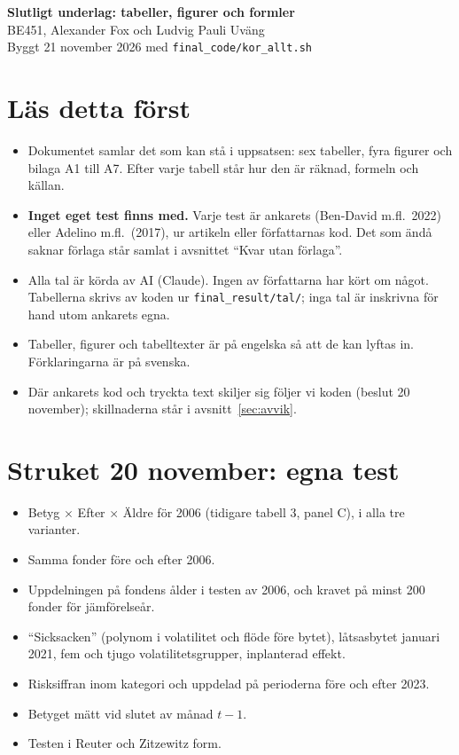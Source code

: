 \documentclass[10pt,a4paper]{article}
\newcommand{\kod}[1]{\texttt{#1}}
\begin{document}
\begin{center}
{\Large\bfseries Slutligt underlag: tabeller, figurer och formler}\\[3pt]
{\large BE451, Alexander Fox och Ludvig Pauli Uväng}\\[3pt]
Byggt 21 november 2026 med \kod{final\_code/kor\_allt.sh}
\end{center}

\section*{Läs detta först}
\begin{itemize}[leftmargin=*,itemsep=1pt]
\item Dokumentet samlar det som kan stå i uppsatsen: sex tabeller, fyra figurer och bilaga A1 till A7. Efter varje tabell står hur den är räknad, formeln och källan.
\item \textbf{Inget eget test finns med.} Varje test är ankarets (Ben-David m.fl.\ 2022) eller Adelino m.fl.\ (2017), ur artikeln eller författarnas kod. Det som ändå saknar förlaga står samlat i avsnittet ``Kvar utan förlaga''.
\item Alla tal är körda av AI (Claude). Ingen av författarna har kört om något. Tabellerna skrivs av koden ur \kod{final\_result/tal/}; inga tal är inskrivna för hand utom ankarets egna.
\item Tabeller, figurer och tabelltexter är på engelska så att de kan lyftas in. Förklaringarna är på svenska.
\item Där ankarets kod och tryckta text skiljer sig följer vi koden (beslut 20 november); skillnaderna står i avsnitt~\ref{sec:avvik}.
\end{itemize}

\section*{Struket 20 november: egna test}
\begin{itemize}[leftmargin=*,itemsep=1pt]
\item Betyg $\times$ Efter $\times$ Äldre för 2006 (tidigare tabell 3, panel C), i alla tre varianter.
\item Samma fonder före och efter 2006.
\item Uppdelningen på fondens ålder i testen av 2006, och kravet på minst 200 fonder för jämförelseår.
\item ``Sicksacken'' (polynom i volatilitet och flöde före bytet), låtsasbytet januari 2021, fem och tjugo volatilitetsgrupper, inplanterad effekt.
\item Risksiffran inom kategori och uppdelad på perioderna före och efter 2023.
\item Betyget mätt vid slutet av månad $t-1$.
\item Testen i Reuter och Zitzewitz form.
\end{itemize}
\end{document}
